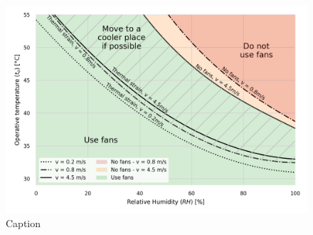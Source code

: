 
\begin{figure}[b!]
    \centering
    \includegraphics[width=\textwidth]{figures/use_fans.png}
    \caption{Caption}
    \label{fig:energy_storage_delta}
\end{figure}


